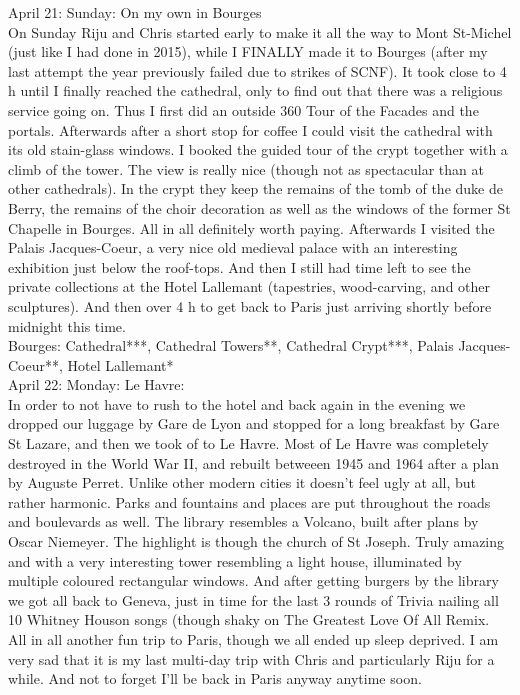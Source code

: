 April 21: Sunday: On my own in Bourges\\
On Sunday Riju and Chris started early to make it all the way to Mont St-Michel (just like I had done in 2015), while I FINALLY made it to Bourges (after my last attempt the year previously failed due to strikes of SCNF). It took close to 4 h until I finally reached the cathedral, only to find out that there was a religious service going on. Thus I first did an outside 360 Tour of the Facades and the portals. Afterwards after a short stop for coffee I could visit the cathedral with its old stain-glass windows. I booked the guided tour of the crypt together with a climb of the tower. The view is really nice (though not as spectacular than at other cathedrals). In the crypt they keep the remains of the tomb of the duke de Berry, the remains of the choir decoration as well as the windows of the former St Chapelle in Bourges. All in all definitely worth paying. Afterwards I visited the Palais Jacques-Coeur, a very nice old medieval palace with an interesting exhibition just below the roof-tops. And then I still had time left to see the private collections at the Hotel Lallemant (tapestries, wood-carving, and other sculptures). And then over 4 h to get back to Paris just arriving shortly before midnight this time.\\

Bourges: Cathedral***, Cathedral Towers**, Cathedral Crypt***,  Palais Jacques-Coeur**, Hotel Lallemant*\\

April 22: Monday: Le Havre:\\
In order to not have to rush to the hotel and back again in the evening we dropped our luggage by Gare de Lyon and stopped for a long breakfast by Gare St Lazare, and then we took of to Le Havre. Most of Le Havre was completely destroyed in the World War II, and rebuilt betweeen 1945 and 1964 after a plan by Auguste Perret. Unlike other modern cities it doesn't feel ugly at all, but rather harmonic. Parks and fountains and places are put throughout the roads and boulevards as well. The library resembles a Volcano, built after plans by Oscar Niemeyer. The highlight is though the church of St Joseph. Truly amazing and with a very interesting tower resembling a light house, illuminated by multiple coloured rectangular windows. And after getting burgers by the library we got all back to Geneva, just in time for the last 3 rounds of Trivia nailing all 10 Whitney Houson songs (though shaky on The Greatest Love Of All Remix. All in all another fun trip to Paris, though we all ended up sleep deprived. I am very sad that it is my last multi-day trip with Chris and particularly Riju for a while. And not to forget I'll be back in Paris anyway anytime soon.\\


